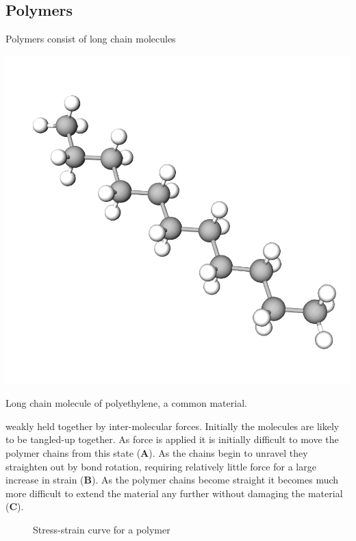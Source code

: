 \subsection{Polymers}

Polymers consist of long chain molecules\begin{marginfigure}
    \centering
    \includegraphics[]{polyethelene.png}
    \caption{Long chain molecule of polyethylene, a common material.}
\end{marginfigure} weakly held together by inter-molecular forces. Initially the molecules are likely to be tangled-up together. As force is applied it is initially difficult to move the polymer chains from this state (\textbf{A}). As the chains begin to unravel they straighten out by bond rotation, requiring relatively little force for a large increase in strain (\textbf{B}). As the polymer chains become straight it becomes much more difficult to extend the material any further without damaging the material (\textbf{C}).

\begin{figure}[ht]
    \begin{center}
    \end{center}
    \caption{Stress-strain curve for a polymer}
    \label{stress-strain-polymer}
\end{figure}

